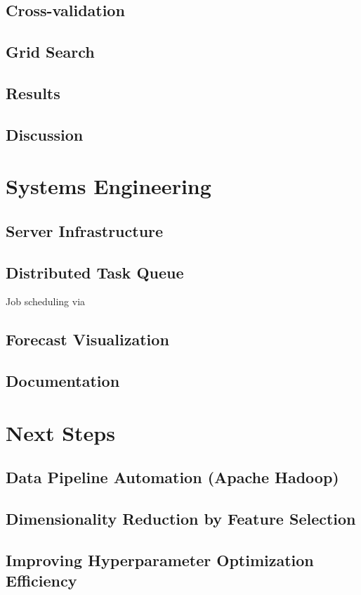 \documentclass[11pt, oneside]{article}
\begin{document}
\subsection{Cross-validation}
\subsection{Grid Search}
\subsection{Results}
\subsection{Discussion}

\section{Systems Engineering}
\subsection{Server Infrastructure}
\subsection{Distributed Task Queue}
Job scheduling via
\subsection{Forecast Visualization}
\subsection{Documentation}

\section{Next Steps}
\subsection{Data Pipeline Automation (Apache Hadoop)}
\subsection{Dimensionality Reduction by Feature Selection}
\subsection{Improving Hyperparameter Optimization Efficiency}
\end{document}
